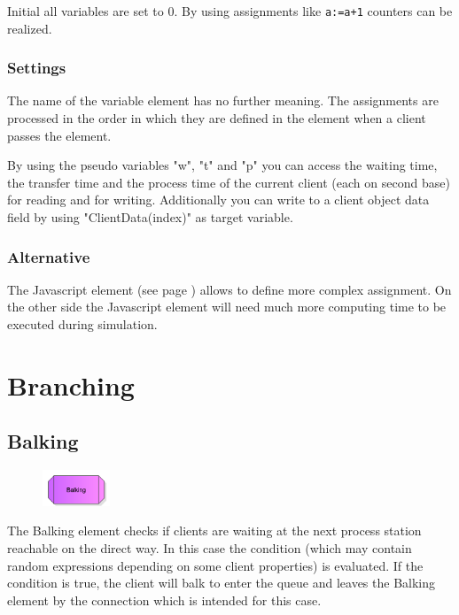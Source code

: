Initial all variables are set to 0. By using assignments like \texttt{a:=a+1} counters can be realized.

\subsection*{Settings}

The name of the variable element has no further meaning.
The assignments are processed in the order in which they are defined in the element when a client passes the element.

By using the pseudo variables "w", "t" and "p" you can access the waiting time, the transfer time and the
process time of the current client (each on second base) for reading and for writing. Additionally you can
write to a client object data field by using "ClientData(index)" as target variable.

\subsection*{Alternative}

The Javascript element (see page \pageref{ref:ModelElementSetJS}) allows to define more complex assignment.
On the other side the Javascript element will need much more computing time to be executed during simulation.





\chapter{Branching}

\section{Balking}
\label{ref:ModelElementBalking}

\begin{figure}
\vspace{-22pt}
\includegraphics[width=2cm]{imageModelElementBalking.png}
\vspace{-22pt}
\end{figure}

The Balking element checks if clients are waiting at the next process station reachable
on the direct way. In this case the condition (which may contain random expressions depending
on some client properties) is evaluated. If the condition is true, the client will balk to
enter the queue and leaves the Balking element by the connection which is intended for this
case.

